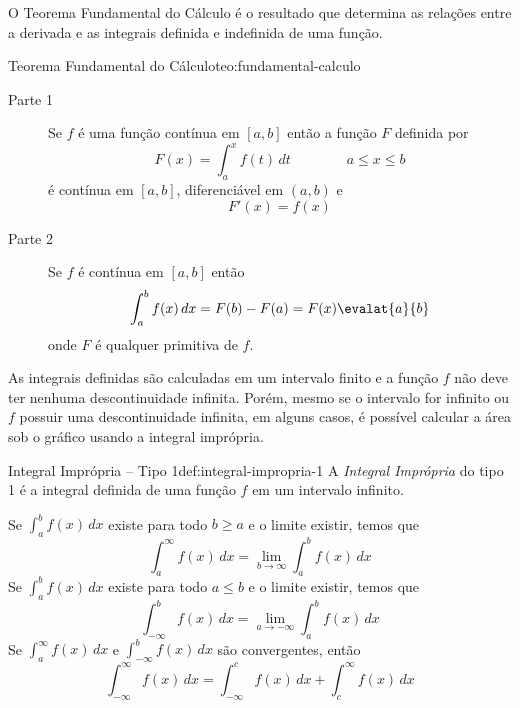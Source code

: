 O Teorema Fundamental do Cálculo é o resultado que determina as relações
entre a derivada e as integrais definida e indefinida de uma função.

\begin{teorema}{Teorema Fundamental do Cálculo}{teo:fundamental-calculo}
\begin{description}
  \item[Parte 1]
  Se $f$ é uma função contínua em $[a, b]$ então a função $F$ definida por
  \[
    F(x) = \int_a^x f(t)\, dt \qquad\qquad a \leq x \leq b
  \]
  é contínua em $[a, b]$, diferenciável em $(a, b)$ e
  \[
    F'(x) = f(x)
  \]
  \item[Parte 2]
  Se $f$ é contínua em $[a, b]$ então
  \[
   \int_a^b f(x)\,dx = F(b) - F(a) = F(x)\evalat{a}{b}
  \]
  onde $F$ é qualquer primitiva de $f$.
\end{description}
\end{teorema}

As integrais definidas são calculadas em um intervalo finito e a função $f$
não deve ter nenhuma descontinuidade infinita. Porém, mesmo se o intervalo for infinito
ou $f$ possuir uma descontinuidade infinita, em alguns casos, é possível
calcular a área sob o gráfico usando a integral imprópria.

\begin{definicao}{Integral Imprópria -- Tipo 1}{def:integral-impropria-1}
  A \emph{Integral Imprópria} do tipo 1
  é a integral definida de uma função $f$ em um intervalo infinito.

  Se \( \int_a^b f(x)\, dx \)
  existe para todo $b\geq a$ e o limite existir, temos que
  \[
    \int_a^\infty f(x)\,dx = \lim_{b\to\infty}\int_a^b f(x)\, dx
  \]
  Se \( \int_a^b f(x)\, dx \)
  existe para todo $a\leq b$ e o limite existir, temos que
  \[
    \int_{-\infty}^b f(x)\,dx = \lim_{a\to-\infty}\int_a^b f(x)\, dx
  \]
  Se \( \int_a^\infty    f(x)\,dx \)
  e  \( \int_{-\infty}^b f(x)\,dx \)
  são convergentes, então
  \[
    \int_{-\infty}^\infty f(x)\,dx = \int_{-\infty}^c f(x)\, dx
                                   + \int_c^\infty    f(x)\, dx
  \]
\end{definicao}

